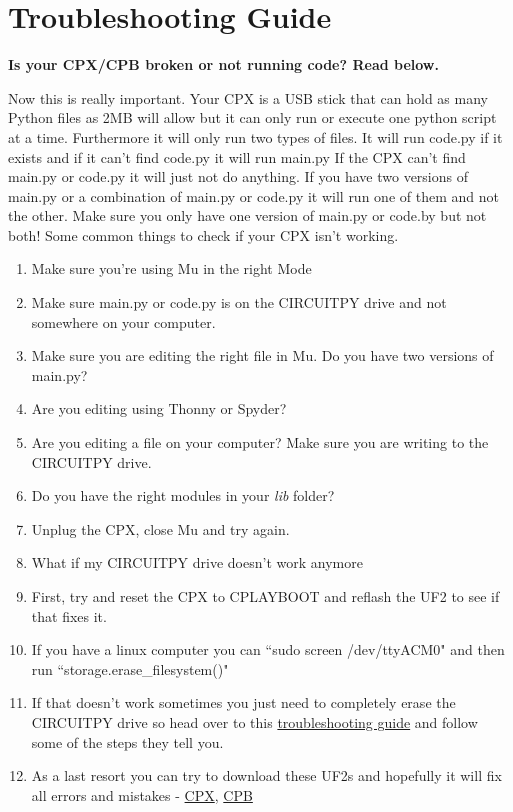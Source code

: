 \section{Troubleshooting Guide}

{\bf Is your CPX/CPB broken or not running code? Read below.}

Now this is really important. Your CPX is a USB stick that can hold as
many Python files as 2MB will allow but it can only run or execute one
python script at a time. Furthermore it will only run two types of
files. It will run code.py if it exists and if it can't find code.py
it will run main.py If the CPX can't find main.py or code.py it will
just not do anything. If you have two versions of main.py or a
combination of main.py or code.py it will run one of them and not the
other. Make sure you only have one version of main.py or code.by but
not both! Some common things to check if your CPX isn't working.

\begin{enumerate}[itemsep=-5pt]
  \item Make sure you're using Mu in the right Mode
  \item Make sure main.py or code.py is on the CIRCUITPY drive and not somewhere on your computer.
  \item Make sure you are editing the right file in Mu. Do you have two versions of main.py?
  \item Are you editing using Thonny or Spyder?
  \item Are you editing a file on your computer? Make sure you are
    writing to the CIRCUITPY drive.
  \item Do you have the right modules in your {\it lib} folder?
  \item Unplug the CPX, close Mu and try again.
  \item What if my CIRCUITPY drive doesn’t work anymore
  \item First, try and reset the CPX to CPLAYBOOT and reflash the UF2 to see if that fixes it.
  \item If you have a linux computer you can ``sudo screen /dev/ttyACM0" and then run ``storage.erase\_filesystem()"
  \item If that doesn’t work sometimes you just need to completely erase the CIRCUITPY drive so head over to this \href{https://learn.adafruit.com/adafruit-circuit-playground-express/troubleshooting}{troubleshooting guide} and follow some of the steps they tell you.
  \item As a last resort you can try to download these UF2s and
    hopefully it will fix all errors and mistakes -
    \href{https://cdn-learn.adafruit.com/assets/assets/000/048/745/original/flash_erase_express.ino.circuitplay.uf2?1512152080}{CPX}, \href{https://cdn-learn.adafruit.com/assets/assets/000/082/950/original/CP_Bluefruit_QSPI_Erase.UF2?1572026649}{CPB}
\end{enumerate}
